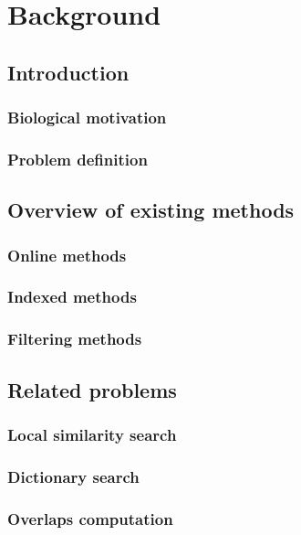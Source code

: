 \chapter{Background}
\section{Introduction}
\subsection{Biological motivation}
\subsection{Problem definition}
\section{Overview of existing methods}
\subsection{Online methods}
\subsection{Indexed methods}
\subsection{Filtering methods}
\section{Related problems}
\subsection{Local similarity search}
\subsection{Dictionary search}
\subsection{Overlaps computation}
